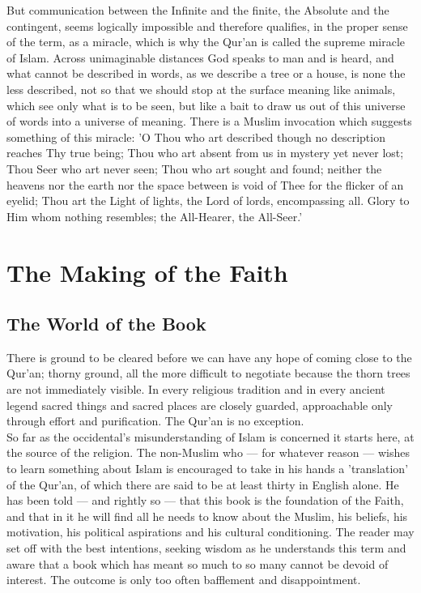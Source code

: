 \documentclass[10pt, twoside]{book}
\begin{document}
But communication between the Infinite and the finite, the Absolute and the contingent, seems 
logically impossible and therefore qualifies, in the proper sense of the term, as a miracle, which is 
why the Qur'an is called the supreme miracle of Islam. Across unimaginable distances God speaks to 
man and is heard, and what cannot be described in words, as we describe a tree or a house, is none 
the less described, not so that we should stop at the surface meaning like animals, which see only 
what is to be seen, but like a bait to draw us out of this universe of words into a universe of 
meaning. There is a Muslim invocation which suggests something of this miracle: 'O Thou who art 
described though no description reaches Thy true being; Thou who art absent from us in mystery yet 
never lost; Thou Seer who art never seen; Thou who art sought and found; neither the heavens nor the 
earth nor the space between is void of Thee for the flicker of an eyelid; Thou art the Light of 
lights, the Lord of lords, encompassing all. Glory to Him whom nothing resembles; the All\hyp{}Hearer, the 
All\hyp{}Seer.' \\


\part{The Making of the Faith}
\chapter{The World of the Book}


There is ground to be cleared before we can have any hope of coming close to the Qur'an; thorny 
ground, all the more difficult to negotiate because the thorn trees are not immediately visible. In 
every religious tradition and in every ancient legend sacred things and sacred places are closely 
guarded, approachable only through effort and purification. The Qur'an is no exception. \\

So far as the occidental's misunderstanding of Islam is concerned it starts here, at the source of 
the religion. The non-Muslim who --- for whatever reason --- wishes to learn something about Islam is 
encouraged to take in his hands a 'translation' of the Qur'an, of which there are said to be at least 
thirty in English alone. He has been told --- and rightly so --- that this book is the foundation of the 
Faith, and that in it he will find all he needs to know about the Muslim, his beliefs, his 
motivation, his political aspirations and his cultural conditioning. The reader may set off with the 
best intentions, seeking wisdom as he understands this term and aware that a book which has meant so 
much to so many cannot be devoid of interest. The outcome is only too often bafflement and 
disappointment. \\
\end{document}
